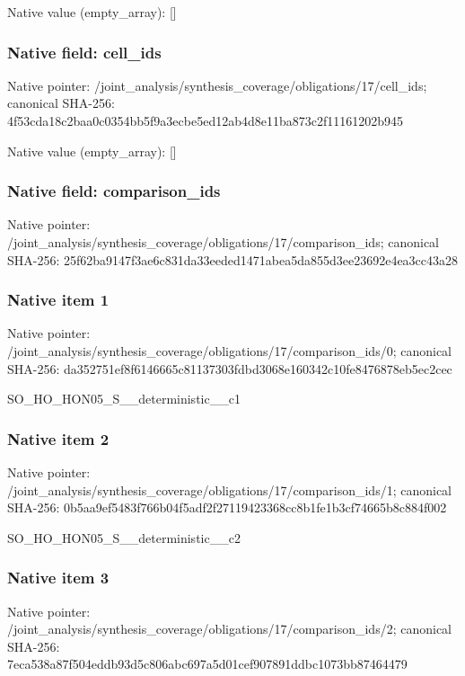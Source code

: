 \documentclass[10pt,a4paper]{article}
\begin{document}
Native value (empty\_\allowbreak{}array): []

\subsubsection{Native field: cell\_\allowbreak{}ids}
Native pointer: /joint\_\allowbreak{}analysis/synthesis\_\allowbreak{}coverage/obligations/17/cell\_\allowbreak{}ids; canonical SHA-256: 4f53cda18c2baa0c0354bb5f9a3ecbe5ed12ab4d8e11ba873c2f11161202b945

Native value (empty\_\allowbreak{}array): []

\subsubsection{Native field: comparison\_\allowbreak{}ids}
Native pointer: /joint\_\allowbreak{}analysis/synthesis\_\allowbreak{}coverage/obligations/17/comparison\_\allowbreak{}ids; canonical SHA-256: 25f62ba9147f3ae6c831da33eeded1471abea5da855d3ee23692e4ea3cc43a28

\subsubsection{Native item 1}
Native pointer: /joint\_\allowbreak{}analysis/synthesis\_\allowbreak{}coverage/obligations/17/comparison\_\allowbreak{}ids/0; canonical SHA-256: da352751ef8f6146665c81137303fdbd3068e160342c10fe8476878eb5ec2cec

\begingroup\raggedright\sloppy SO\_\allowbreak{}HO\_\allowbreak{}HON05\_\allowbreak{}S\_\allowbreak{}\_\allowbreak{}deterministic\_\allowbreak{}\_\allowbreak{}c1\par\endgroup

\subsubsection{Native item 2}
Native pointer: /joint\_\allowbreak{}analysis/synthesis\_\allowbreak{}coverage/obligations/17/comparison\_\allowbreak{}ids/1; canonical SHA-256: 0b5aa9ef5483f766b04f5adf2f27119423368cc8b1fe1b3cf74665b8c884f002

\begingroup\raggedright\sloppy SO\_\allowbreak{}HO\_\allowbreak{}HON05\_\allowbreak{}S\_\allowbreak{}\_\allowbreak{}deterministic\_\allowbreak{}\_\allowbreak{}c2\par\endgroup

\subsubsection{Native item 3}
Native pointer: /joint\_\allowbreak{}analysis/synthesis\_\allowbreak{}coverage/obligations/17/comparison\_\allowbreak{}ids/2; canonical SHA-256: 7eca538a87f504eddb93d5c806abc697a5d01cef907891ddbc1073bb87464479
\end{document}
